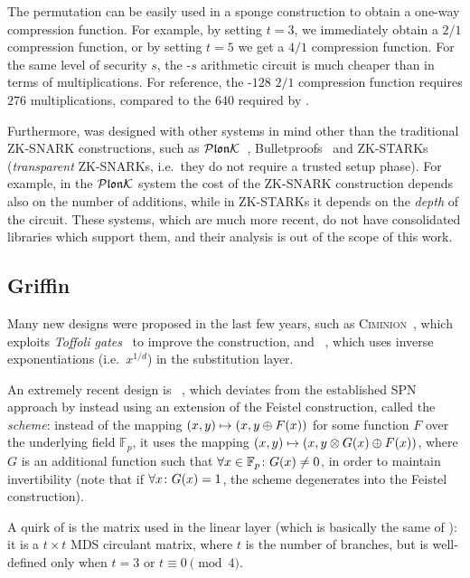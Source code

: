 The \Poseidon{} permutation can be easily used in a sponge construction to obtain a
one-way compression function.
For example, by setting \(t = 3\), we immediately obtain a \(2/1\) compression function, 
or by setting \(t = 5\) we get a \(4/1\) compression function.
For the same level of security \(s\), the \Poseidon-\(s\) arithmetic circuit is much cheaper than 
\Mimc{} in terms of multiplications. 
For reference, the \Poseidon-\(128\) \(2/1\) compression function requires \(276\) 
multiplications, compared to the \(640\) required by \Mimc{}.

Furthermore, \Poseidon{} was designed with other systems in mind other than the traditional 
ZK-SNARK constructions, such as \(\mathcal{P}\mathfrak{lon}\mathcal{K} \)~\cite{GabizonWC2019}, 
Bulletproofs~\cite{BunzBBPWM2017} and ZK-STARKs~\cite{SassonBHR2018} 
(\emph{transparent} ZK-SNARKs, i.e.\ they do not require a trusted setup phase).
For example, in the \(\mathcal{P}\mathfrak{lon}\mathcal{K} \) system the cost of the ZK-SNARK construction depends also 
on the number of additions, while in ZK-STARKs it depends on the \emph{depth} of the circuit.
These systems, which are much more recent, do not have consolidated libraries which support them, 
and their analysis is out of the scope of this work.

\subsection{Griffin}
Many new designs were proposed in the last few years, such as 
\textsc{Ciminion}~\cite{DobraunigGGK2021}, which exploits \emph{Toffoli gates}~\cite{Toffoli1980} 
to improve the construction, and \Rescue~\cite{AlyABDS2019}, which uses inverse 
exponentiations (i.e.\  \(x^{1/d}\)) in the substitution layer.

An extremely recent design is \Griffin~\cite{GrassiHRSWW2022}, which deviates from the
established SPN approach by instead using an extension of the Feistel construction, called the 
\emph{\Horst{} scheme}: instead of the mapping 
\(\Tuple{x, y} \mapsto \Tuple{x, y \oplus \call{F}{x}}\) for some function \(F\) over the 
underlying field \(\mathbb{F}_p\), it uses the mapping 
\(\Tuple{x, y} \mapsto \Tuple{x, y \otimes \call{G}{x} \oplus \call{F}{x}}\), where \(G\) is an 
additional function such that \(\forall x \in \mathbb{F}_p\colon \call{G}{x} \neq 0\), in order 
to maintain invertibility (note that if \(\forall x\colon \call{G}{x} = 1\), the \Horst{} scheme
degenerates into the Feistel construction).

A quirk of \Griffin{} is the matrix used in the linear layer (which is basically the same of 
\Poseidon): it is a \(t \times t\) MDS circulant matrix, where \(t\) is the number of branches, 
but is well-defined only when \(t = 3\) or \(t \equiv 0 \pmod{4}\).

